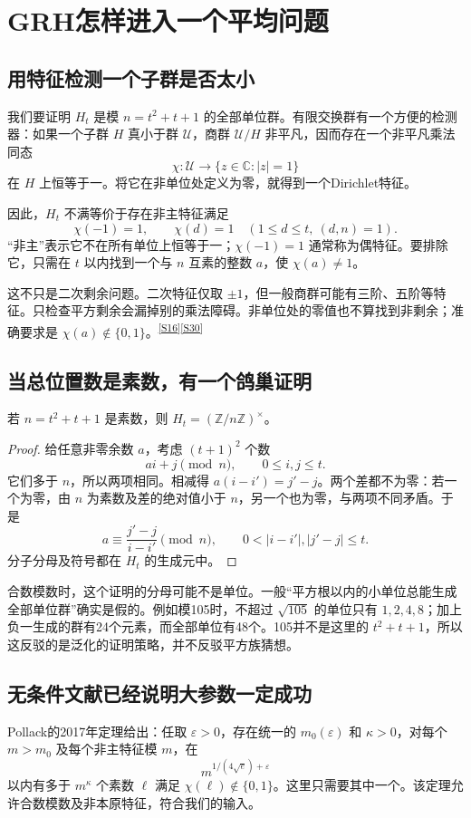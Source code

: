 \documentclass[11pt,a4paper,oneside,openany]{book}
\newcommand{\Z}{\mathbb Z}\newcommand{\Q}{\mathbb Q}\newcommand{\F}{\mathbb F}\newcommand{\CC}{\mathbb C}
\newcommand{\src}[1]{\textsuperscript{\hyperref[source:#1]{[#1]}}}
\theoremstyle{definition}\newtheorem{example}[theorem]{例}\newtheorem{conjecture}[theorem]{猜想}
\numberwithin{equation}{chapter}\setcounter{tocdepth}{1}
\begin{document}
\chapter{GRH怎样进入一个平均问题}\label{ch:characters}
\section{用特征检测一个子群是否太小}
我们要证明 $H_t$ 是模 $n=t^2+t+1$ 的全部单位群。有限交换群有一个方便的检测器：如果一个子群 $H$ 真小于群 $\mathcal U$，商群 $\mathcal U/H$ 非平凡，因而存在一个非平凡乘法同态
\[\chi:\mathcal U\longrightarrow\{z\in\CC:|z|=1\}
\]
在 $H$ 上恒等于一。将它在非单位处定义为零，就得到一个Dirichlet特征。

因此，$H_t$ 不满等价于存在非主特征满足
\[\chi(-1)=1,\qquad\chi(d)=1\quad(1\le d\le t,\ (d,n)=1).
\]
“非主”表示它不在所有单位上恒等于一；$\chi(-1)=1$ 通常称为偶特征。要排除它，只需在 $t$ 以内找到一个与 $n$ 互素的整数 $a$，使 $\chi(a)\ne1$。

这不只是二次剩余问题。二次特征仅取 $\pm1$，但一般商群可能有三阶、五阶等特征。只检查平方剩余会漏掉别的乘法障碍。非单位处的零值也不算找到非剩余；准确要求是 $\chi(a)\notin\{0,1\}$。\src{S16}\src{S30}

\section{当总位置数是素数，有一个鸽巢证明}
\begin{proposition}
若 $n=t^2+t+1$ 是素数，则 $H_t=(\Z/n\Z)^\times$。
\end{proposition}
\begin{proof}
给任意非零余数 $a$，考虑 $(t+1)^2$ 个数
\[ai+j\pmod n,\qquad0\le i,j\le t.
\]
它们多于 $n$，所以两项相同。相减得 $a(i-i')=j'-j$。两个差都不为零：若一个为零，由 $n$ 为素数及差的绝对值小于 $n$，另一个也为零，与两项不同矛盾。于是
\[a\equiv\frac{j'-j}{i-i'}\pmod n,
\qquad0<|i-i'|,|j'-j|\le t.
\]
分子分母及符号都在 $H_t$ 的生成元中。
\end{proof}

合数模数时，这个证明的分母可能不是单位。一般“平方根以内的小单位总能生成全部单位群”确实是假的。例如模105时，不超过 $\sqrt{105}$ 的单位只有 $1,2,4,8$；加上负一生成的群有24个元素，而全部单位有48个。105并不是这里的 $t^2+t+1$，所以这反驳的是泛化的证明策略，并不反驳平方族猜想。

\section{无条件文献已经说明大参数一定成功}
Pollack的2017年定理给出：任取 $\varepsilon>0$，存在统一的 $m_0(\varepsilon)$ 和 $\kappa>0$，对每个 $m>m_0$ 及每个非主特征模 $m$，在
\[m^{1/(4\sqrt e)+\varepsilon}
\]
以内有多于 $m^\kappa$ 个素数 $\ell$ 满足 $\chi(\ell)\notin\{0,1\}$。这里只需要其中一个。该定理允许合数模数及非本原特征，符合我们的输入。\cite{Pollack2017}
\end{document}
